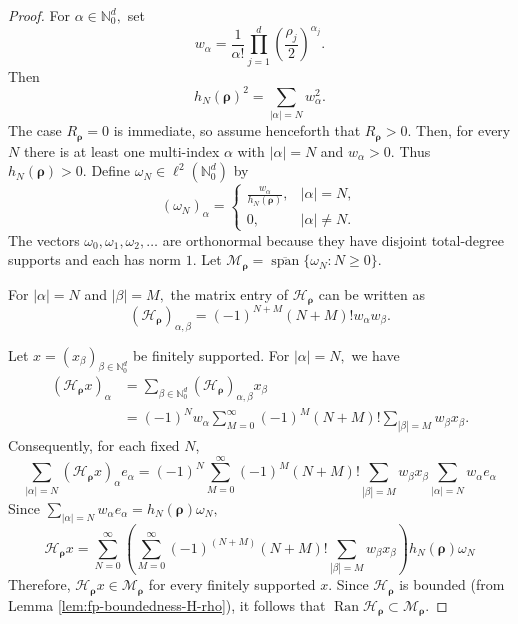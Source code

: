\documentclass[12pt, reqno]{amsart}
\numberwithin{equation}{section}
\begin{document}
\begin{proof}
For $\alpha\in\mathbb{N}_{0}^{d},$ set
\[
w_{\alpha}
=
\frac{1}{\alpha!}
\prod_{j=1}^{d}
\left(\frac{\rho_j}{2}\right)^{\alpha_j}.
\]
Then
\[
h_N(\boldsymbol{\rho})^{2}
=
\sum_{|\alpha|=N}w_{\alpha}^{2}.
\]
The case  \(R_{\boldsymbol{\rho}}=0\)  is immediate, so assume henceforth that $R_{\boldsymbol{\rho}}>0$. Then,  for every \(N\) there is at least one multi-index \(\alpha\) with $|\alpha|=N$ and $w_{\alpha}>0.$
Thus $h_N(\boldsymbol{\rho})>0.$ Define
$\omega_N\in\ell^{2}(\mathbb{N}_{0}^{d})$ by
\[
(\omega_N)_{\alpha}
=
\begin{cases}
\displaystyle \frac{w_{\alpha}}{h_N(\boldsymbol{\rho})}, & |\alpha|=N,\\[6pt]
0, & |\alpha|\neq N.
\end{cases}
\]
The vectors $\omega_0,\omega_1,\omega_2,\ldots$ are orthonormal because they have disjoint total-degree supports and each has norm \(1\). Let $\mathcal{M}_{\boldsymbol{\rho}}=\overline{\operatorname{span}}\{\omega_N:N\geq 0\}$.

For $|\alpha|=N$ and $|\beta|=M,$ the matrix entry of \(\mathcal{H}_{\boldsymbol{\rho}}\) can be written as
\[
(\mathcal{H}_{\boldsymbol{\rho}})_{\alpha,\beta}
=
(-1)^{N+M}(N+M)!w_{\alpha}w_{\beta}.
\]

Let $x=(x_{\beta})_{\beta\in\mathbb{N}_{0}^{d}}$ be finitely supported. For $|\alpha|=N,$ we have
\[
\begin{aligned}
(\mathcal{H}_{\boldsymbol{\rho}}x)_{\alpha}
&=
\sum_{\beta\in\mathbb{N}_{0}^{d}}
(\mathcal{H}_{\boldsymbol{\rho}})_{\alpha,\beta}x_{\beta}  \\
&=
(-1)^Nw_{\alpha}
\sum_{M=0}^{\infty}
(-1)^M(N+M)!
\sum_{|\beta|=M}w_{\beta}x_{\beta}.
\end{aligned}
\]
Consequently, for each fixed \(N\),
\[
\sum_{|\alpha|=N}(\mathcal{H}_{\boldsymbol{\rho}}x)_{\alpha}e_{\alpha}= (-1)^N
\sum_{M=0}^{\infty}
(-1)^M(N+M)!
\sum_{|\beta|=M}w_{\beta}x_{\beta} \sum_{|\alpha|=N}w_{\alpha}e_{\alpha}
\]
Since $\sum_{|\alpha|=N}w_{\alpha}e_{\alpha}
= h_N(\boldsymbol{\rho})\omega_N,$
\[
\mathcal{H}_{\boldsymbol{\rho}}x =  \sum_{N=0}^{\infty}\left (
\sum_{M=0}^{\infty}
(-1)^{(N+M)}(N+M)!
\sum_{|\beta|=M}w_{\beta}x_{\beta} \right  )h_N(\boldsymbol{\rho})\omega_N
\]
Therefore, $\mathcal{H}_{\boldsymbol{\rho}}x\in \mathcal{M}_{\boldsymbol{\rho}}$  for every finitely supported \(x\). Since \(\mathcal{H}_{\boldsymbol{\rho}}\) is bounded (from Lemma \ref{lem:fp-boundedness-H-rho}), it follows that
$\operatorname{Ran}\mathcal{H}_{\boldsymbol{\rho}}
\subset \mathcal{M}_{\boldsymbol{\rho}}.$



\end{proof}
\end{document}
